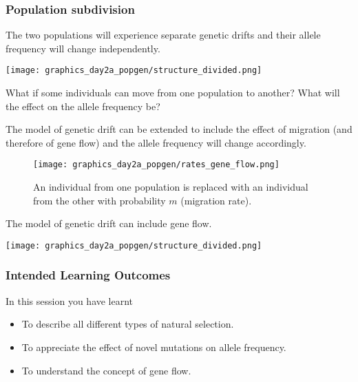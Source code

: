 \documentclass{beamer}
\newcommand{\1}{\ensuremath{\mathbf{1}}}
\begin{document}
%
%
%
\begin{frame}\frametitle{Population subdivision}
	The two populations will experience separate genetic drifts and their allele frequency will change independently.
	\begin{center}
		\texttt{[image: graphics\_day2a\_popgen/structure\_divided.png]}
	\end{center}
	What if some individuals can move from one population to another? What will the effect on the allele frequency be?
\end{frame}
%
%
%
\begin{frame}
	The model of genetic drift can be extended to include the effect of migration (and therefore of gene flow) and the allele frequency will change accordingly.
	\begin{figure}
	\begin{center}
		\texttt{[image: graphics\_day2a\_popgen/rates\_gene\_flow.png]}
	\end{center}
	\caption{An individual from one population is replaced with an individual from the other with probability $m$ (migration rate).}
	\end{figure}
\end{frame}
%
%
%
\begin{frame}
	The model of genetic drift can include gene flow.
	\begin{center}
		\texttt{[image: graphics\_day2a\_popgen/structure\_divided.png]}
	\end{center}
\end{frame}
%
%
%
\begin{frame}\frametitle{Intended Learning Outcomes}
	In this session you have learnt
	\begin{itemize}
		\item To describe all different types of natural selection.
		\item To appreciate the effect of novel mutations on allele frequency.
		\item To understand the concept of gene flow.
	\end{itemize}
\end{frame}
%
%
%
\end{document}
